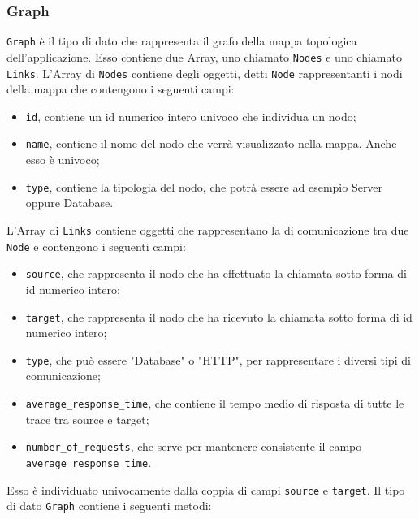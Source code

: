 \subsubsection{Graph}
\label{sec:Graph}
	\texttt{Graph} è il tipo di dato che rappresenta il grafo della mappa topologica dell'applicazione. Esso contiene due Array, uno chiamato \texttt{Nodes} e uno chiamato \texttt{Links}.
	\label{sec:Nodes}
	L'Array di \texttt{Nodes} contiene degli oggetti, detti \texttt{Node} rappresentanti i nodi della mappa che contengono i seguenti campi:
	\begin{itemize}
		\item \texttt{id}, contiene un id numerico intero univoco che individua un nodo;
		\item \texttt{name}, contiene il nome del nodo che verrà visualizzato nella mappa. Anche esso è univoco;
		\item \texttt{type}, contiene la tipologia del nodo, che potrà essere ad esempio Server oppure Database.
	\end{itemize}
	\label{sec:Links}
	L'Array di \texttt{Links} contiene oggetti che rappresentano la di comunicazione tra due \texttt{Node} e contengono i seguenti campi:
	\begin{itemize}
		\item{\texttt{source}, che rappresenta il nodo che ha effettuato la chiamata sotto forma di id numerico intero;}
		\item{\texttt{target}, che rappresenta il nodo che ha ricevuto la chiamata sotto forma di id numerico intero;}
		\item{\texttt{type}, che può essere "Database" o "HTTP", per rappresentare i diversi tipi di comunicazione;}
		\item{\texttt{average\_response\_time}, che contiene il tempo medio di risposta di tutte le trace tra source e target;}
		\item{\texttt{number\_of\_requests}, che serve per mantenere consistente il campo \texttt{average\_response\_time}.}
	\end{itemize}
	Esso è individuato univocamente dalla coppia di campi \texttt{source} e \texttt{target}.
	Il tipo di dato \texttt{Graph} contiene i seguenti metodi:
